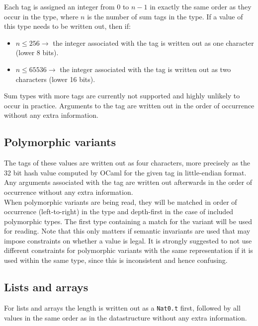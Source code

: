 \documentclass[12pt]{article}
\begin{document}
Each tag is assigned an integer from $0$ to $n - 1$ in exactly the same order
as they occur in the type, where $n$ is the number of sum tags in the type.
If a value of this type needs to be written out, then if:

\begin{itemize}
\item $n \leq 256 \rightarrow$ the integer associated with the tag is written out as one character (lower 8 bits).
\item $n \leq 65536 \rightarrow$ the integer associated with the tag is written out as two characters (lower 16 bits).
\end{itemize}

Sum types with more tags are currently not supported and highly unlikely
to occur in practice.  Arguments to the tag are written out in the order of
occurrence without any extra information.

\subsection{Polymorphic variants}

The tags of these values are written out as four characters, more
precisely as the 32 bit hash value computed by OCaml for the given tag in
little-endian format.  Any arguments associated with the tag are written
out afterwards in the order of occurrence without any extra information.\\

When polymorphic variants are being read, they will be matched in order
of occurrence (left-to-right) in the type and depth-first in the case of
included polymorphic types.  The first type containing a match for the
variant will be used for reading.  Note that this only matters if semantic
invariants are used that may impose constraints on whether a value is legal.
It is strongly suggested to not use different constraints for polymorphic
variants with the same representation if it is used within the same type,
since this is inconsistent and hence confusing.

\subsection{Lists and arrays}

For lists and arrays the length is written out as a \verb=Nat0.t= first,
followed by all values in the same order as in the datastructure without
any extra information.
\end{document}
